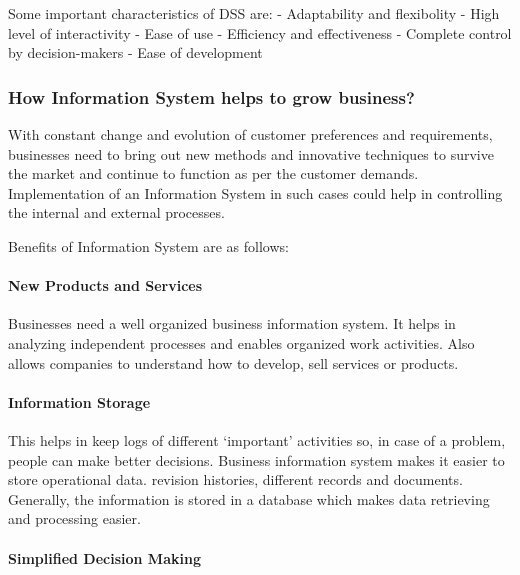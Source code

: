 \documentclass{memoir}
\begin{document}
Some important characteristics of DSS are: - Adaptability and
flexibolity - High level of interactivity - Ease of use - Efficiency and
effectiveness - Complete control by decision-makers - Ease of
development

\hypertarget{how-information-system-helps-to-grow-business}{%
\subsubsection{How Information System helps to grow
business?}\label{how-information-system-helps-to-grow-business}}

With constant change and evolution of customer preferences and
requirements, businesses need to bring out new methods and innovative
techniques to survive the market and continue to function as per the
customer demands. Implementation of an Information System in such cases
could help in controlling the internal and external processes.

Benefits of Information System are as follows:

\hypertarget{new-products-and-services}{%
\paragraph{New Products and Services}\label{new-products-and-services}}

Businesses need a well organized business information system. It helps
in analyzing independent processes and enables organized work
activities. Also allows companies to understand how to develop, sell
services or products.

\hypertarget{information-storage}{%
\paragraph{Information Storage}\label{information-storage}}

This helps in keep logs of different `important' activities so, in case
of a problem, people can make better decisions. Business information
system makes it easier to store operational data. revision histories,
different records and documents. Generally, the information is stored in
a database which makes data retrieving and processing easier.

\hypertarget{simplified-decision-making}{%
\paragraph{Simplified Decision
Making}\label{simplified-decision-making}}
\end{document}
